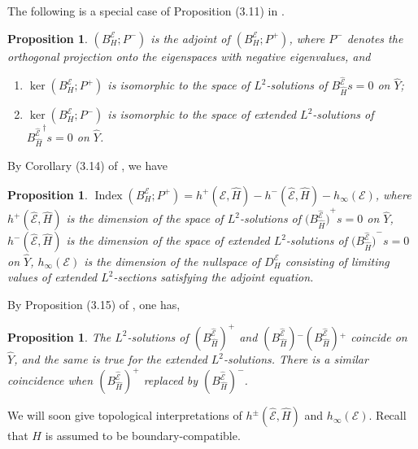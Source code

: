 \documentclass[12pt]{amsart}
\theoremstyle{plain}
\newtheorem{proposition}[theorem]{Proposition}
\theoremstyle{definition}
\theoremstyle{remark}
\begin{document}
The following is a special case of  Proposition (3.11) in \cite{APS1}. 

\begin{proposition}\label{prop:sig2}
$(B^{\mathcal E}_H; P^-)$ is the adjoint of $(B^{\mathcal E}_H; P^+)$,  where $P^-$ denotes the orthogonal projection onto the 
eigenspaces with negative eigenvalues, and 
\begin{enumerate}
\item $\ker(B^{\mathcal E}_H; P^+)$ is isomorphic to the space of $L^2$-solutions of ${{B^{\hat{\mathcal E}}_{\hat H}}} s=0$ on $\hat Y$;
\item $\ker(B^{\mathcal E}_H; P^-)$ is isomorphic to the space of extended $L^2$-solutions of ${{{B^{\hat{\mathcal E}}_{\hat H}}}}^\dagger s=0$ on $\hat Y$.
\end{enumerate}
\end{proposition}

By Corollary (3.14) of \cite{APS1}, we have

\begin{proposition}\label{prop:sig3}
${\operatorname{Index}}(B^{\mathcal E}_H; P^+) = h^+(\hat{\mathcal E}, \hat H) - h^-(\hat{\mathcal E}, \hat H) - h_\infty({\mathcal E})$, where $h^+(\hat{\mathcal E}, \hat H) $
is the dimension of the space of $L^2$-solutions of $({{B^{\hat {\mathcal E}}_{\hat H})}}^+ s=0$ on $\hat Y$, $h^-(\hat{\mathcal E}, \hat H) $
is the dimension of the space of extended $L^2$-solutions of $({{B^{\hat {\mathcal E}}_{\hat H})}}^- s=0$ on $\hat Y$, $h_\infty({\mathcal E})$
is the dimension of the nullspace of $D^{\mathcal E}_H$ consisting of limiting values of extended $L^2$-sections satisfying the adjoint equation. 
\end{proposition}

By Proposition (3.15) of \cite{APS1}, one has,

\begin{proposition}\label{prop:sig4}
The $L^2$-solutions of $({{B^{\hat {\mathcal E}}_{\hat H}}})^+$ and {{$(B^{\hat {\mathcal E}}_{\hat H}){{^-}} (B^{\hat {\mathcal E}}_{\hat H}){{^+}}$}} coincide on $\hat Y$,  and the same is true 
for the extended $L^2$-solutions. There is a similar coincidence when {{ $(B^{\hat {\mathcal E}}_{\hat H})^+$ replaced by $(B^{\hat {\mathcal E}}_{\hat H})^-$}}.
\end{proposition}

We will soon give topological interpretations of  $h^\pm(\hat{\mathcal E}, \hat H)$  and $h_\infty({\mathcal E})$. {{Recall that $H$ is assumed to be boundary-compatible.}}
\end{document}
